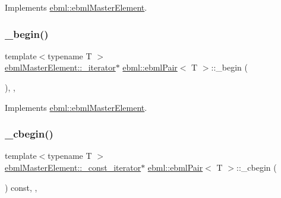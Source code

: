 Implements \mbox{\hyperlink{classebml_1_1ebmlMasterElement_a3af0270846a1ced1719d26dd261f0355}{ebml\+::ebml\+Master\+Element}}.

\mbox{\label{classebml_1_1ebmlPair_a1bd75b88b0b88d39a48283a2d8e9be4e}} 
\subsubsection{\texorpdfstring{\+\_\+begin()}{\_begin()}}
{\footnotesize\ttfamily template$<$typename T $>$ \\
\mbox{\hyperlink{classebml_1_1ebmlMasterElement_1_1__iterator}{ebml\+Master\+Element\+::\+\_\+iterator}}$\ast$ \mbox{\hyperlink{classebml_1_1ebmlPair}{ebml\+::ebml\+Pair}}$<$ T $>$\+::\+\_\+begin (\begin{DoxyParamCaption}{ }\end{DoxyParamCaption})\hspace{0.3cm}{\ttfamily [override]}, {\ttfamily [protected]}, {\ttfamily [virtual]}}



Implements \mbox{\hyperlink{classebml_1_1ebmlMasterElement_af6fb7a9934e9b8d0c64273ef6944f44b}{ebml\+::ebml\+Master\+Element}}.

\mbox{\label{classebml_1_1ebmlPair_aa52de57679fd688de58ffebb225db68e}} 
\subsubsection{\texorpdfstring{\+\_\+cbegin()}{\_cbegin()}}
{\footnotesize\ttfamily template$<$typename T $>$ \\
\mbox{\hyperlink{classebml_1_1ebmlMasterElement_1_1__const__iterator}{ebml\+Master\+Element\+::\+\_\+const\+\_\+iterator}}$\ast$ \mbox{\hyperlink{classebml_1_1ebmlPair}{ebml\+::ebml\+Pair}}$<$ T $>$\+::\+\_\+cbegin (\begin{DoxyParamCaption}{ }\end{DoxyParamCaption}) const\hspace{0.3cm}{\ttfamily [override]}, {\ttfamily [protected]}, {\ttfamily [virtual]}}




